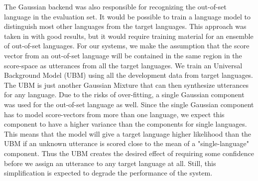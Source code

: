The Gaussian backend was also responsible for recognizing the out-of-set language in the evaluation set. It would be possible to train a language model to distinguish most other languages from the target languages. This approach was taken in \cite[p. 55]{matejkalre} with good results, but it would require training material for an ensemble of out-of-set languages. For our systems, we make the assumption that the score vector from an out-of-set language will be contained in the same region in the score-space as utterances from all the target languages. We train an Universal Background Model (UBM) using all the development data from target languages. The UBM is just another Gaussian Mixture that can then synthesize utterances for any language. Due to the risks of over-fitting, a single Gaussian component was used for the out-of-set language as well. Since the single Gaussian component has to model score-vectors from more than one language, we expect this component to have a higher variance than the components for single languages. This means that the model will give a target language higher likelihood than the UBM if an unknown utterance is scored close to the mean of a "single-language" component. Thus the UBM creates the desired effect of requiring some confidence before we assign an utterance to any target language at all. Still, this simplification is expected to degrade the performance of the system.

